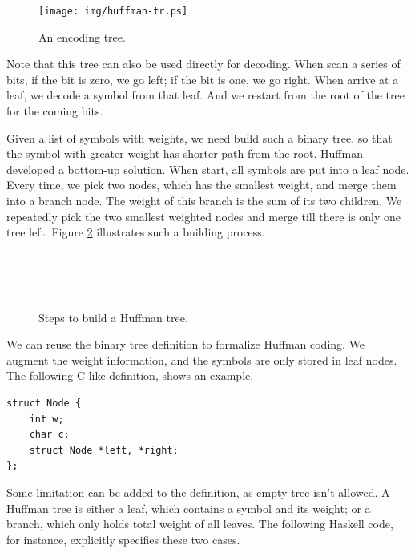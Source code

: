\documentclass[UTF8]{article}
\begin{document}
\begin{figure}[htbp]
 \centering
 \texttt{[image: img/huffman-tr.ps]}
 \caption{An encoding tree.}
 \label{fig:huffman-tr}
\end{figure}

Note that this tree can also be used directly for decoding. When scan a series of
bits, if the bit is zero, we go left; if the bit is one, we go right. When arrive
at a leaf, we decode a symbol from that leaf. And we restart from the root of the
tree for the coming bits.

Given a list of symbols with weights, we need build such a binary tree, so that the
symbol with greater weight has shorter path from the root. Huffman developed a bottom-up
solution. When start, all symbols are put into a leaf node. Every time, we pick two
nodes, which has the smallest weight, and merge them into a branch node. The weight
of this branch is the sum of its two children. We repeatedly pick the two smallest
weighted nodes and merge till there is only one tree left. Figure \ref{fig:huffman-build}
illustrates such a building process.

\begin{figure}[htbp]
 \centering
  \\
  \\
  \\
 \caption{Steps to build a Huffman tree.}
 \label{fig:huffman-build}
\end{figure}

We can reuse the binary tree definition to formalize Huffman coding. We augment
the weight information, and the symbols are only stored in leaf nodes. The following
C like definition, shows an example.

\lstset{language=C}
\begin{lstlisting}
struct Node {
    int w;
    char c;
    struct Node *left, *right;
};
\end{lstlisting}

Some limitation can be added to the definition, as empty tree isn't allowed.
A Huffman tree is either a leaf, which contains a symbol and its weight; or
a branch, which only holds total weight of all leaves. The following Haskell
code, for instance, explicitly specifies these two cases.
\end{document}
